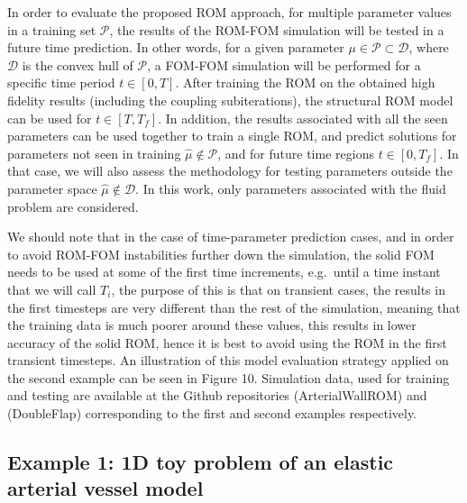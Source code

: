 \documentclass[11pt]{article}
\begin{document}
In order to evaluate the proposed ROM approach, for multiple parameter values in a training set $\mathcal{P}$, the results of the ROM-FOM simulation will be tested in a future time prediction. In other words, for a given parameter $\mu \in \mathcal{P} \subset \mathcal{D}$, where $\mathcal{D}$ is the convex hull of $\mathcal{P}$, a FOM-FOM simulation will be performed for a specific time period $t \in [0,T]$. After training the ROM on the obtained high fidelity results (including the coupling subiterations), the structural ROM model can be used for $t \in [T,T_f]$. In addition, the results associated with all the seen parameters can be used together to train a single ROM, and predict solutions for parameters not seen in training $\hat{\mu} \notin \mathcal{P}$, and for future time regions $t \in [0,T_f]$. In that case, we will also assess the methodology for testing parameters outside the parameter space $\hat{\mu} \notin \mathcal{D}$. In this work, only parameters associated with the fluid problem are considered.

We should note that in the case of time-parameter prediction cases, and in order to avoid ROM-FOM instabilities further down the simulation, the solid FOM needs to be used at some of the first time increments, e.g.\ until a time instant that we will call $T_i$, the purpose of this is that on transient cases, the results in the first timesteps are very different than the rest of the simulation, meaning that the training data is much poorer around these values, this results in lower accuracy of the solid ROM, hence it is best to avoid using the ROM in the first transient timesteps. An illustration of this model evaluation strategy applied on the second example can be seen in Figure 10. Simulation data, used for training and testing are available at the Github repositories (ArterialWallROM) and (DoubleFlap) corresponding to the first and second examples respectively.

\subsection{Example 1: 1D toy problem of an elastic arterial vessel model}
\end{document}

